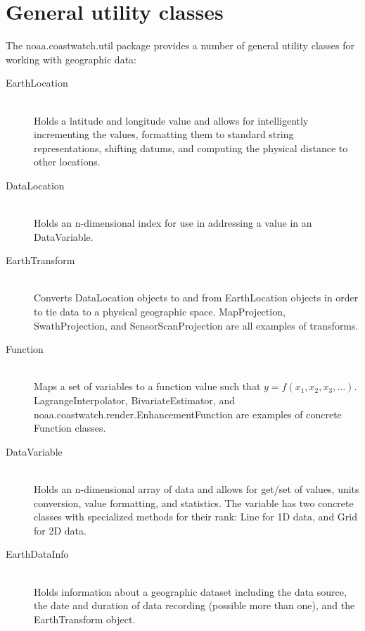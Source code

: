 \section{General utility classes}

The {\java noaa.coastwatch.util} package provides a number of
general utility classes for working with geographic data:
\begin{description}

\item[{\java EarthLocation}]~\\ Holds a latitude and longitude
value and allows for intelligently incrementing the values,
formatting them to standard string representations, shifting
datums, and computing the physical distance to other locations.

\item[{\java DataLocation}]~\\ Holds an n-dimensional index for
use in addressing a value in an {\java DataVariable}.

\item[{\java EarthTransform}]~\\ Converts {\java DataLocation}
objects to and from {\java EarthLocation} objects in order to tie
data to a physical geographic space.  {\java MapProjection},
{\java SwathProjection}, and {\java SensorScanProjection} are all
examples of transforms.

\item[{\java Function}]~\\ Maps a set of variables to a function
value such that $y = f(x_1, x_2, x_3, ...)$.  {\java
LagrangeInterpolator}, {\java BivariateEstimator}, and {\java
noaa.coastwatch.render.EnhancementFunction} are examples of
concrete {\java Function} classes.

\item[{\java DataVariable}]~\\ Holds an n-dimensional array of
data and allows for get/set of values, units conversion, value
formatting, and statistics.  The variable has two concrete
classes with specialized methods for their rank: {\java Line} for
1D data, and {\java Grid} for 2D data.

\item[{\java EarthDataInfo}]~\\ Holds information about a
geographic dataset including the data source, the date and
duration of data recording (possible more than one), and the
{\java EarthTransform} object.


\end{description}
